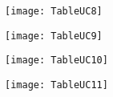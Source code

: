 \begin{center}

\centering
\texttt{[image: TableUC8]}
\end{center}

\begin{center}

\centering
\texttt{[image: TableUC9]}
\end{center}

\begin{center}

\centering
\texttt{[image: TableUC10]}
\end{center}

\begin{center}
	
\centering
\texttt{[image: TableUC11]}
\end{center}
 

